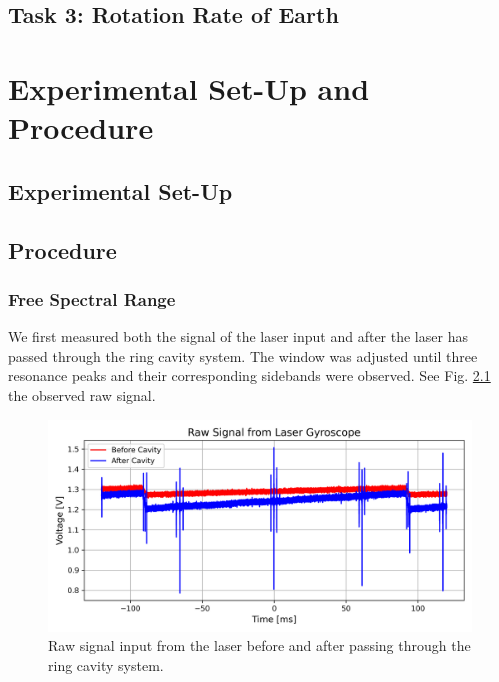 \documentclass[a4paper]{report}
\numberwithin{equation}{section}
\begin{document}
\section{Task 3: Rotation Rate of Earth}



\chapter{Experimental Set-Up and Procedure}

\section{Experimental Set-Up}


\section{Procedure}

\subsection{Free Spectral Range}

We first measured both the signal of the laser input and after the laser
has passed through the ring cavity system. The window was adjusted until three resonance peaks and their corresponding sidebands
were observed. See Fig. \ref{fig:threeres_raw} the observed raw signal. 

\begin{figure}[h!]
	\centering
	\includegraphics[width=0.8\columnwidth]{threeres_raw.png}
	\caption{Raw signal input from the laser before and after passing through the ring 
			cavity system.}
	\label{fig:threeres_raw}
\end{figure}
\end{document}
